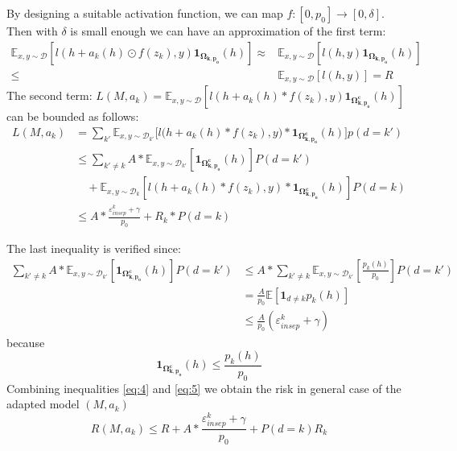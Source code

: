 \documentclass[12pt,times,a4paper,twoside]{article}
\newcommand{\fyTodo}[1]{\Todo[FY:]{\textcolor{orange}{#1}}}
\theoremstyle{definition}
\begin{document}
By designing a suitable activation function, we can map $f: [0,p_{0}] \rightarrow [0,\delta]$. Then with $\delta$ is small enough we can have an approximation of the first term:\fyTodo{We need $l$ to be smooth here, no ?}
\begin{align*}
  \mathbb{E}_{x,y \sim \mathcal{D}}[l(h + a_k(h) \odot f(z_k),y)\mathbf{1}_{\mathbf{\Omega_{k,p_{0}}}}(h)] \approx{}&
                                                                                                                      \mathbb{E}_{x,y \sim \mathcal{D}}[l(h,y)\mathbf{1}_\mathbf{\Omega_{k,p_{0}}}(h)] \\
  \leq& \mathbb{E}_{x,y \sim \mathcal{D}}[l(h,y)] = R
\label{eq:4}
\end{align*}
The second term: $ L(M,a_k) = \mathbb{E}_{x,y \sim \mathcal{D}}[l(h + a_k(h) * f(z_k),y) \mathbf{1}_{\mathbf{\Omega_{k,p_{0}}^{c}}}(h)]$ can be bounded as follows:
\begin{equation*}
\begin{split}
L(M,a_k) &= \displaystyle{\mathop{\sum}_{k'}\mathbb{E}_{x,y \sim \mathcal{D}_{k'}}[l(h } + a_k(h) * f(z_k),y) * \mathbf{1}_{\mathbf{\Omega_{k,p_{0}}^{c}}}(h)]p(d=k') \\
	& \leq \displaystyle{\mathop{\sum}_{k' \neq k}} A * \mathbb{E}_{x,y \sim \mathcal{D}_{k'}} [\mathbf{1}_{\mathbf{\Omega_{k,p_{0}}^{c}}}(h)]P(d=k') \\
	& \quad + \mathbb{E}_{x,y \sim \mathcal{D}_k}[l(h + a_k(h) * f(z_k),y) * \mathbf{1}_{\mathbf{\Omega_{k,p_{0}}^{c}}}(h)]P(d=k) \\
	&\leq A * \frac{\mathbb{\varepsilon}_{insep}^k + \gamma}{p_{0}} + R_k * P(d=k)
\end{split}
\label{eq:5}
\end{equation*}

The last inequality is verified since:
\begin{equation}
\begin{split}
\displaystyle{\mathop{\sum}_{k' \neq k}} A * \mathbb{E}_{x,y \sim \mathcal{D}_{k'}} [\mathbf{1}_{\mathbf{\Omega_{k,p_{0}}^{c}}} (h)]P(d=k') &\leq A * \displaystyle{\mathop{\sum}_{k' \neq k}} \mathbb{E}_{x,y \sim \mathcal{D}_{k'} } [\frac{p_k(h)}{p_0}]P(d=k') \\
		& = \frac{A}{p_0} \mathbb{E}[\mathbf{1}_{d\neq k}p_k(h)] \\
		& \leq \frac{A}{p_0} (\mathbb{\varepsilon}_{insep}^k + \gamma)
\end{split}
\end{equation}
because
$$ \mathbf{1}_{\mathbf{\Omega_{k,p_{0}}^{c}}}(h) \leq \frac{p_k(h)}{p_0} $$
Combining inequalities \ref{eq:4} and \ref{eq:5} we obtain the risk in general case of the adapted model $(M,a_k)$ $$R(M,a_k) \leq R + A * \frac{\mathbb{\varepsilon}_{insep}^k + \gamma}{p_0} + P(d=k)R_k$$
\end{document}
